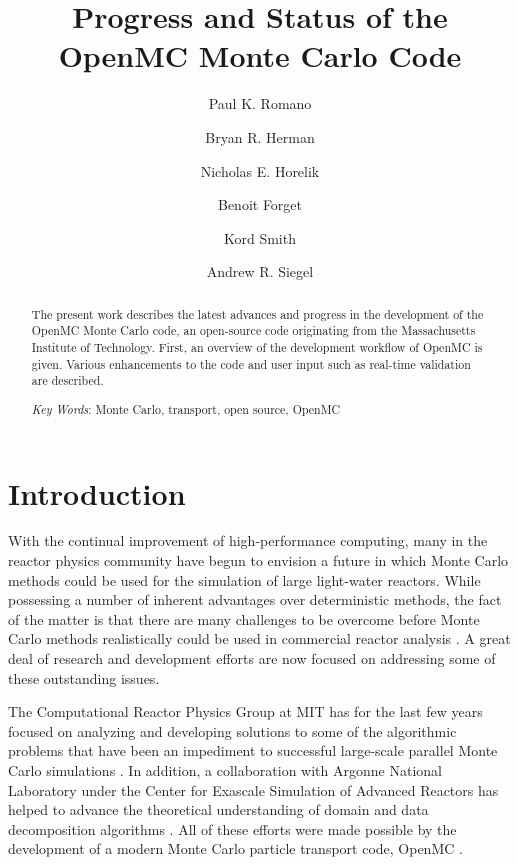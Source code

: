 \documentclass{ansconf}
\begin{document}
\title{Progress and Status of the OpenMC Monte Carlo Code}

\author{Paul K. Romano}
\author{Bryan R. Herman}
\author{Nicholas E. Horelik}
\author{Benoit Forget}
\author{Kord Smith}

\author{Andrew R. Siegel}

\maketitle

\begin{abstract}
The present work describes the latest advances and progress in the development
of the OpenMC Monte Carlo code, an open-source code originating from the
Massachusetts Institute of Technology. First, an overview of the development
workflow of OpenMC is given. Various enhancements to the code and user input
such as real-time validation are described.

\emph{Key Words}: Monte Carlo, transport, open source, OpenMC
\end{abstract}

\section{Introduction}

With the continual improvement of high-performance computing, many in the
reactor physics community have begun to envision a future in which Monte Carlo
methods could be used for the simulation of large light-water reactors. While
possessing a number of inherent advantages over deterministic methods, the fact
of the matter is that there are many challenges to be overcome before Monte
Carlo methods realistically could be used in commercial reactor analysis
\cite{net-martin-2012}. A great deal of research and development efforts are now
focused on addressing some of these outstanding issues.

The Computational Reactor Physics Group at MIT has for the last few years
focused on analyzing and developing solutions to some of the algorithmic
problems that have been an impediment to successful large-scale parallel Monte
Carlo simulations \cite{pnst-romano-2011, nse-romano-2012,
  trans-romano-2012}. In addition, a collaboration with Argonne National
Laboratory under the Center for Exascale Simulation of Advanced Reactors has
helped to advance the theoretical understanding of domain and data decomposition
algorithms \cite{jcp-siegel-2012-1, jcp-siegel-2012-2}. All of these efforts
were made possible by the development of a modern Monte Carlo particle transport
code, OpenMC \cite{openmc-github-2012}.
\end{document}
